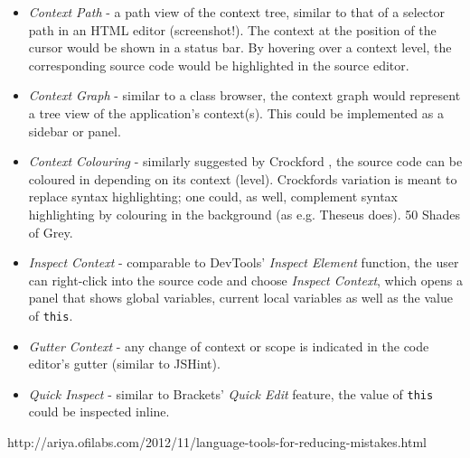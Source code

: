 \begin{itemize}
\itemsep1pt\parskip0pt
\item
  \emph{Context Path} - a path view of the context tree, similar to that
  of a selector path in an HTML editor (screenshot!). The context at the
  position of the cursor would be shown in a status bar. By hovering
  over a context level, the corresponding source code would be
  highlighted in the source editor.
\item
  \emph{Context Graph} - similar to a class browser, the context graph
  would represent a tree view of the application’s context(s). This
  could be implemented as a sidebar or panel.
\item
  \emph{Context Colouring} - similarly suggested by Crockford
  \citeyear{crockford}, the source code can be coloured in depending on
  its context (level). Crockfords variation is meant to replace syntax
  highlighting; one could, as well, complement syntax highlighting by
  colouring in the background (as e.g. Theseus does). 50 Shades of Grey.
\item
  \emph{Inspect Context} - comparable to DevTools’ \emph{Inspect
  Element} function, the user can right-click into the source code and
  choose \emph{Inspect Context}, which opens a panel that shows global
  variables, current local variables as well as the value of
  \texttt{this}.
\item
  \emph{Gutter Context} - any change of context or scope is indicated in
  the code editor’s gutter (similar to JSHint).
\item
  \emph{Quick Inspect} - similar to Brackets’ \emph{Quick Edit} feature,
  the value of \texttt{this} could be inspected inline.
\end{itemize}

http://ariya.ofilabs.com/2012/11/language-tools-for-reducing-mistakes.html
